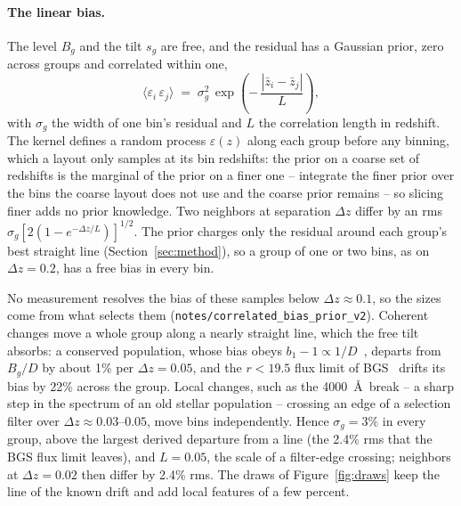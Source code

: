 \documentclass[11pt]{article}
\newcommand{\sigG}{3\%}
\newcommand{\Lcorr}{0.05}
\newcommand{\NeighborRms}{2.4\%}
\newcommand{\ConsDrift}{1\%}
\newcommand{\BGSspan}{22\%}
\newcommand{\BGScurv}{2.4\%}
\newcommand{\FilterDzMin}{0.03}
\newcommand{\FilterDzMax}{0.05}
\newcommand{\MeasuredDz}{0.1}
\begin{document}
\paragraph{The linear bias.}
The level $B_g$ and the tilt $s_g$ are free, and the residual has a
Gaussian prior, zero across groups and correlated within one,
\begin{equation}
  \bigl\langle \varepsilon_i\,\varepsilon_j \bigr\rangle
  \;=\; \sigma_g^2\,
  \exp\!\left(-\,\frac{|\bar{z}_i - \bar{z}_j|}{L}\right) ,
  \label{eq:kernel}
\end{equation}
with $\sigma_g$ the width of one bin's residual and $L$ the correlation
length in redshift.  The kernel defines a random process
$\varepsilon(z)$ along each group before any binning, which a layout
only samples at its bin redshifts: the prior on a coarse set of
redshifts is the marginal of the prior on a finer one -- integrate
the finer prior over the bins the coarse layout does not use and the
coarse prior remains -- so slicing finer adds no prior knowledge.  Two neighbors at separation $\Delta z$ differ
by an rms $\sigma_g[2(1 - e^{-\Delta z/L})]^{1/2}$.  The prior charges
only the residual around each group's best straight line
(Section~\ref{sec:method}), so a group of one or two bins, as on
$\Delta z = 0.2$, has a free bias in every bin.

No measurement resolves the bias of these samples below
$\Delta z \approx \MeasuredDz$, so the sizes come from what selects
them (\texttt{notes/correlated\_bias\_prior\_v2}).  Coherent changes
move a whole group along a nearly straight line, which the free tilt
absorbs: a conserved population, whose bias obeys
$b_1 - 1 \propto 1/D$~\cite{Fry1996}, departs from $B_g/D$ by about
\ConsDrift{} per $\Delta z = 0.05$, and the $r < 19.5$ flux limit of
BGS~\cite{Hahn2023} drifts its bias by \BGSspan{} across the group.
Local changes, such as the 4000~\AA\ break -- a sharp step in the
spectrum of an old stellar population -- crossing an edge of a
selection filter over
$\Delta z \approx \FilterDzMin$--$\FilterDzMax$, move bins
independently.  Hence $\sigma_g = \sigG$ in every group, above the
largest derived departure from a line (the \BGScurv{} rms that the BGS
flux limit leaves), and $L = \Lcorr$, the scale of a filter-edge
crossing; neighbors at $\Delta z = 0.02$ then differ by \NeighborRms{}
rms.  The draws of Figure~\ref{fig:draws} keep the line of the known
drift and add local features of a few percent.
\end{document}
